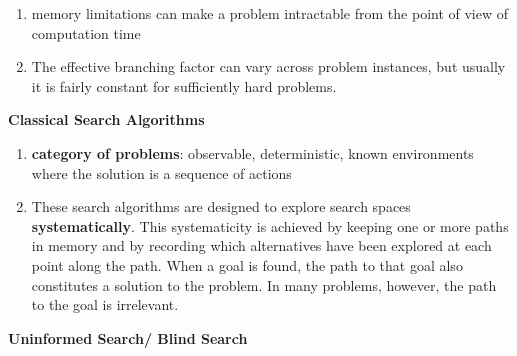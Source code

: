 \begin{enumerate}
\begin{enumerate}
    \end{enumerate}

    \item memory limitations can make a problem intractable from the point of view of computation time
    \hfill \cite{ai/book/Artificial-Intelligence-A-Modern-Approach/Russell-Norvig}

    \item The effective branching factor can vary across problem instances, but usually it is fairly constant for sufficiently hard problems.
    \hfill \cite{ai/book/Artificial-Intelligence-A-Modern-Approach/Russell-Norvig}
\end{enumerate}


\vspace{1cm}
{\centering\fontsize{25}{25}\selectfont\bfseries Classical Search Algorithms \par}
\vspace{0.5cm}

\begin{enumerate}
    \item \textbf{category of problems}: observable, deterministic, known environments where the solution is a sequence of actions
    \hfill \cite{ai/book/Artificial-Intelligence-A-Modern-Approach/Russell-Norvig}

    \item These search algorithms are designed to explore search spaces \textbf{systematically}.
    This systematicity is achieved by keeping one or more paths in memory and by recording which alternatives have been explored at each point along the path.
    When a goal is found, the path to that goal also constitutes a solution to the problem.
    In many problems, however, the path to the goal is irrelevant.
    \hfill \cite{ai/book/Artificial-Intelligence-A-Modern-Approach/Russell-Norvig}
\end{enumerate}
\vspace{0.5cm}


\clearpage
{\centering\fontsize{22}{22}\selectfont\bfseries Uninformed Search/ Blind Search \par}
\vspace{0.5cm}













